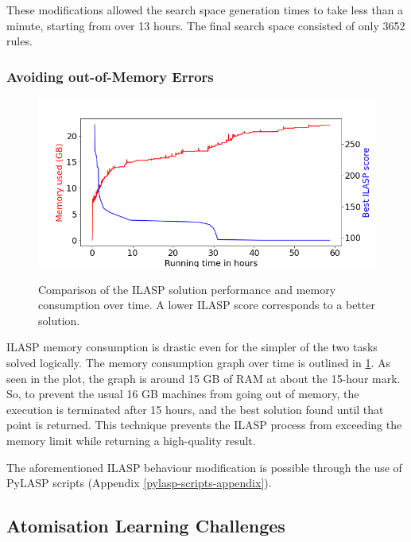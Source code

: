 These modifications allowed the search space generation times to take less than a minute, starting from over 13 hours.
The final search space consisted of only 3652 rules.


\subsubsection{Avoiding out-of-Memory Errors}
\label{avoiding-oom-errors}

\begin{figure}[h]
\caption{Comparison of the ILASP solution performance and memory consumption over time. A lower ILASP score corresponds to a better solution.}
\centering
\includegraphics[width=\textwidth]{solving-nlp-tasks-logically/generalisation_memory_vs_best_score.png}
\label{generalisation-memory-graph}
\end{figure}

ILASP memory consumption is drastic even for the simpler of the two tasks solved logically.
The memory consumption graph over time is outlined in \ref{generalisation-memory-graph}.
As seen in the plot, the graph is around 15 GB of RAM at about the 15-hour mark.
So, to prevent the usual 16 GB machines from going out of memory, the execution is terminated after 15 hours, and the best solution found until that point is returned.
This technique prevents the ILASP process from exceeding the memory limit while returning a high-quality result.

The aforementioned ILASP behaviour modification is possible through the use of PyLASP scripts (Appendix \ref{pylasp-scripts-appendix}).

\subsection{Atomisation Learning Challenges}
\label{atomisation-learning-challenges}


